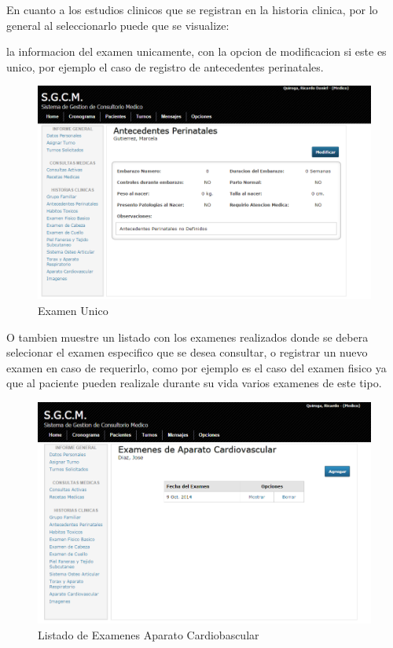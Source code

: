 En cuanto a los estudios clinicos que se registran en la historia clinica, por 
lo general al seleccionarlo puede que se visualize: 


la informacion del examen unicamente, con la opcion de modificacion si este es 
unico, por ejemplo el caso de registro de antecedentes perinatales.

\begin{figure}[H]
    \centering
    \includegraphics[scale=0.5]{resourse/modificar-perinatales.png}
    \caption{Examen Unico}
    \label{fig:618}
\end{figure}

O tambien muestre un listado con los examenes realizados donde se debera selecionar el 
examen especifico que se desea consultar, o registrar un nuevo examen en caso 
de requerirlo, como por ejemplo es el caso del examen fisico ya que al paciente 
pueden realizale durante su vida varios examenes de este tipo.

\begin{figure}[H]
    \centering
    \includegraphics[scale=0.5]{resourse/listado-cardio.png}
    \caption{Listado de Examenes Aparato Cardiobascular}
    \label{fig:619}
\end{figure}


